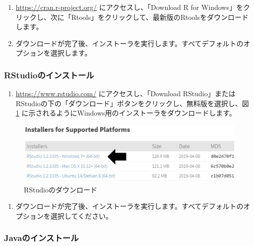 \documentclass[
  11pt]{book}
\providecommand{\tightlist}{%
  \setlength{\itemsep}{0pt}\setlength{\parskip}{0pt}}
\theoremstyle{definition}
\theoremstyle{definition}
\theoremstyle{definition}
\theoremstyle{definition}
\theoremstyle{remark}
\begin{document}
\begin{enumerate}
\def\labelenumi{\arabic{enumi}.}
\item
  \url{https://cran.r-project.org/} にアクセスし、「Download R for Windows」をクリックし、次に「Rtools」をクリックして、最新版のRtoolsをダウンロードします。
\item
  ダウンロードが完了後、インストーラを実行します。すべてデフォルトのオプションを選択します。
\end{enumerate}

\subsubsection*{RStudioのインストール}\label{rstudioux306eux30a4ux30f3ux30b9ux30c8ux30fcux30eb}

\begin{enumerate}
\def\labelenumi{\arabic{enumi}.}
\tightlist
\item
  \url{https://www.rstudio.com/} にアクセスし、「Download RStudio」またはRStudioの下の「ダウンロード」ボタンをクリックし、無料版を選択し、図 \ref{fig:downloadRStudio} に示されるようにWindows用のインストーラをダウンロードします。
\end{enumerate}

\begin{figure}

{\centering \includegraphics[width=1\linewidth]{images/OhdsiAnalyticsTools/downloadRStudio} 

}

\caption{RStudioのダウンロード}\label{fig:downloadRStudio}
\end{figure}

\begin{enumerate}
\def\labelenumi{\arabic{enumi}.}
\setcounter{enumi}{1}
\tightlist
\item
  ダウンロードが完了後、インストーラを実行します。すべてデフォルトのオプションを選択してください。
\end{enumerate}

\subsubsection*{Javaのインストール}\label{javaux306eux30a4ux30f3ux30b9ux30c8ux30fcux30eb}
\end{document}
